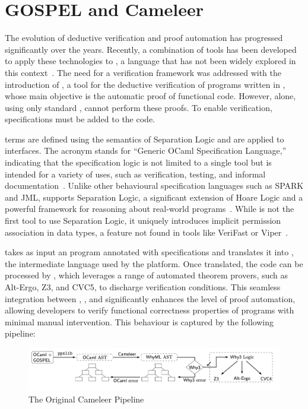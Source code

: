 \section{GOSPEL and Cameleer}
\label{sec:Cameleer}

The evolution of deductive verification and proof automation has progressed significantly over the years. Recently, a 
combination of tools has been developed to apply these technologies to \ocaml, a language that has not been widely explored in 
this context~\cite{PereiraR20}. The need for a verification framework was addressed with the introduction of \cameleer, a tool 
for the deductive verification of programs written in \ocaml, whose main objective is the automatic proof of functional code. 
However, \cameleer alone, using only standard \ocaml, cannot perform these proofs. To enable verification, \gospel specifications 
must be added to the \ocaml code.

\gospel terms are defined using the semantics of Separation Logic and are applied to \ocaml interfaces. The acronym \gospel stands 
for “Generic OCaml Specification Language,” indicating that the specification logic is not limited to a single tool but is intended 
for a variety of uses, such as verification, testing, and informal documentation~\cite{ChargueraudFLP19}. Unlike other behavioural 
specification languages such as \textsf{SPARK} and \textsf{JML}, \gospel supports Separation Logic, a significant extension of Hoare 
Logic and a powerful framework for reasoning about real-world programs~\cite{Reynolds02, OHearnRY01}. While \gospel is not the first 
tool to use Separation Logic, it uniquely introduces implicit permission association in data types, a feature not found in tools 
like \textsf{VeriFast} or \textsf{Viper}~\cite{ChargueraudFLP19}.

\cameleer takes as input an \ocaml program annotated with \gospel specifications and translates it into \whyml, the intermediate 
language used by the \whythree platform. Once translated, the code can be processed by \whythree, which leverages a range of automated 
theorem provers, such as Alt-Ergo, Z3, and CVC5, to discharge verification conditions. This seamless integration between \cameleer, 
\gospel, and \whythree significantly enhances the level of proof automation, allowing developers to verify functional correctness 
properties of \ocaml programs with minimal manual intervention. This behaviour is captured by the following pipeline:

\begin{figure}[H]
    \centering
    \includegraphics[width=\linewidth]{images/Cameleer_From_Paper.png}
    \caption{The Original Cameleer Pipeline~\cite{PereiraR20}}
    \label{fig:CameleerPipeline}
\end{figure}

